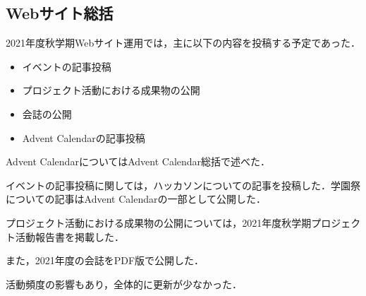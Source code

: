 \subsection*{Webサイト総括}


2021年度秋学期Webサイト運用では，主に以下の内容を投稿する予定であった．

\begin{itemize}
  \item イベントの記事投稿
  \item プロジェクト活動における成果物の公開
  \item 会誌の公開
  \item Advent Calendarの記事投稿
\end{itemize}

Advent CalendarについてはAdvent Calendar総括で述べた．

イベントの記事投稿に関しては，ハッカソンについての記事を投稿した．学園祭についての記事はAdvent Calendarの一部として公開した．

プロジェクト活動における成果物の公開については，2021年度秋学期プロジェクト活動報告書を掲載した．

また，2021年度の会誌をPDF版で公開した．

活動頻度の影響もあり，全体的に更新が少なかった．